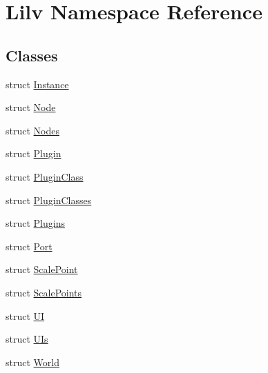 \hypertarget{namespace_lilv}{}\section{Lilv Namespace Reference}
\label{namespace_lilv}
\subsection*{Classes}
\begin{DoxyCompactItemize}
\item 
struct \hyperlink{struct_lilv_1_1_instance}{Instance}
\item 
struct \hyperlink{struct_lilv_1_1_node}{Node}
\item 
struct \hyperlink{struct_lilv_1_1_nodes}{Nodes}
\item 
struct \hyperlink{struct_lilv_1_1_plugin}{Plugin}
\item 
struct \hyperlink{struct_lilv_1_1_plugin_class}{Plugin\+Class}
\item 
struct \hyperlink{struct_lilv_1_1_plugin_classes}{Plugin\+Classes}
\item 
struct \hyperlink{struct_lilv_1_1_plugins}{Plugins}
\item 
struct \hyperlink{struct_lilv_1_1_port}{Port}
\item 
struct \hyperlink{struct_lilv_1_1_scale_point}{Scale\+Point}
\item 
struct \hyperlink{struct_lilv_1_1_scale_points}{Scale\+Points}
\item 
struct \hyperlink{struct_lilv_1_1_u_i}{UI}
\item 
struct \hyperlink{struct_lilv_1_1_u_is}{U\+Is}
\item 
struct \hyperlink{struct_lilv_1_1_world}{World}
\end{DoxyCompactItemize}
